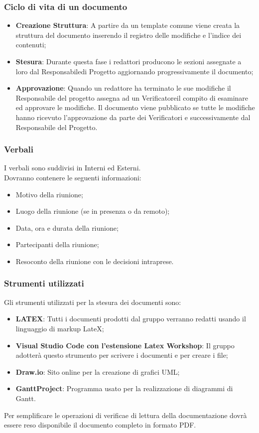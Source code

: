 \subsubsection{Ciclo di vita di un documento}
\begin{itemize}
    \item \textbf{Creazione Struttura}: A partire da un template comune viene creata la struttura del documento inserendo il registro delle modifiche e l’indice dei contenuti;
    \item \textbf{Stesura}: Durante questa fase i redattori producono le sezioni assegnate a loro dal Responsabile\glo di Progetto aggiornando progressivamente il documento;
    \item \textbf{Approvazione}: Quando un redattore ha terminato le sue modifiche il Responsabile del progetto assegna ad un Verificatore\glo il compito di esaminare ed approvare le modifiche.
Il documento viene pubblicato se tutte le modifiche hanno ricevuto l’approvazione da parte dei Verificatori e successivamente dal Responsabile del Progetto.
\end{itemize}

\subsubsection{Verbali}\label{Verbali}
I verbali sono suddivisi in Interni ed Esterni.\\
Dovranno contenere le seguenti informazioni:
\begin{itemize}
    \item Motivo della riunione;
    \item Luogo della riunione (se in presenza o da remoto);
    \item Data, ora e durata della riunione;
    \item Partecipanti della riunione;
    \item Resoconto della riunione con le decisioni intraprese.
\end{itemize}

\subsubsection{Strumenti utilizzati}
Gli strumenti utilizzati per la stesura dei documenti sono:
\begin{itemize}
    \item \textbf{LATEX}: Tutti i documenti prodotti dal gruppo verranno redatti usando il linguaggio di markup LateX;
    \item \textbf{Visual Studio Code con l’estensione Latex Workshop}: Il gruppo adotterà questo strumento per scrivere i documenti e per creare i file;
    \item \textbf{Draw.io}: Sito online per la creazione di grafici UML;
    \item \textbf{GanttProject}: Programma usato per la realizzazione di diagrammi di Gantt.
\end{itemize}
Per semplificare le operazioni di verifica\glo e di lettura della documentazione dovrà essere reso disponibile il documento completo in formato PDF.


